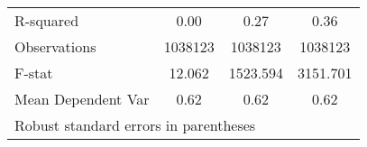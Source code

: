 {\begin{tabular}{l*{3}{c}}
\hline
R-squared           &        0.00         &        0.27         &        0.36         \\
Observations        &     1038123         &     1038123         &     1038123         \\
F-stat              &      12.062         &    1523.594         &    3151.701         \\
Mean Dependent Var  &        0.62         &        0.62         &        0.62         \\
\hline\hline
\multicolumn{4}{l}{\footnotesize Robust standard errors in parentheses}\\
\end{tabular}
}
